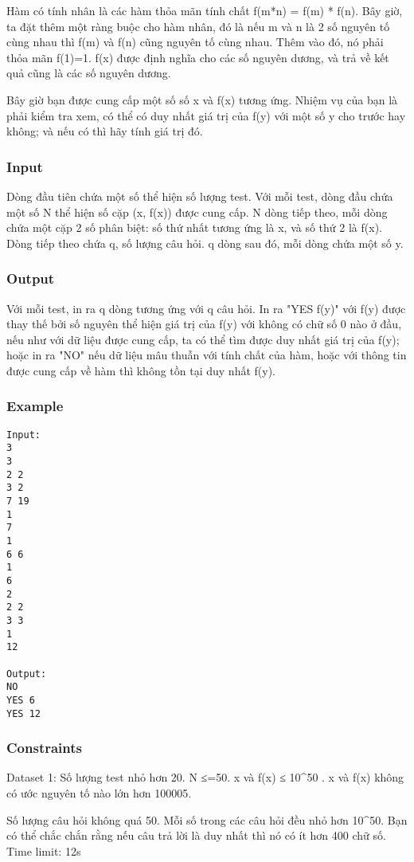 



   Hàm có tính nhân là các hàm thỏa mãn tính chất f(m*n) = f(m) * f(n). Bây giờ, ta đặt thêm một ràng buộc cho hàm nhân, đó là nếu m và n là 2 số nguyên tố cùng nhau thì f(m) và f(n) cũng nguyên tố cùng nhau. Thêm vào đó, nó phải thỏa mãn f(1)=1. f(x) được định nghĩa cho các số nguyên dương, và trả về kết quả cũng là các số nguyên dương.  

   Bây giờ bạn được cung cấp một số số x và f(x) tương ứng. Nhiệm vụ của bạn là phải kiểm tra xem, có thể có duy nhất giá trị của f(y) với một số y cho trước hay không; và nếu có thì hãy tính giá trị đó.  

\subsubsection{   Input  }

   Dòng đầu tiên chứa một số thể hiện số lượng test. Với mỗi test, dòng đầu chứa một số N thể hiện số cặp (x, f(x)) được cung cấp. N dòng tiếp theo, mỗi dòng chứa một cặp 2 số phân biệt: số thứ nhất tương ứng là x, và số thứ 2 là f(x). Dòng tiếp theo chứa q, số lượng câu hỏi. q dòng sau đó, mỗi dòng chứa một số y.  

\subsubsection{   Output  }

   Với mỗi test, in ra q dòng tương ứng với q câu hỏi. In ra "YES f(y)" với f(y) được thay thế bởi số nguyên thể hiện giá trị của f(y) với không có chữ số 0 nào ở đầu, nếu như với dữ liệu được cung cấp, ta có thể tìm được duy nhất giá trị của f(y); hoặc in ra "NO" nếu dữ liệu mâu thuẫn với tính chất của hàm, hoặc với thông tin được cung cấp về hàm thì không tồn tại duy nhất f(y).  

\subsubsection{   Example  }
\begin{verbatim}
Input:
3
3
2 2
3 2
7 19
1
7
1
6 6
1
6
2
2 2
3 3
1
12

Output:
NO
YES 6
YES 12
\end{verbatim}

\subsubsection{   Constraints  }

   Dataset 1: Số lượng test nhỏ hơn 20. N ≤=50. x và f(x) ≤ 10^50 . x và f(x) không có ước nguyên tố nào lớn hơn 100005.  

   Số lượng câu hỏi không quá 50. Mỗi số trong các câu hỏi đều nhỏ hơn 10^50. Bạn có thể chắc chắn rằng nếu câu trả lời là duy nhất thì nó có ít hơn 400 chữ số. Time limit: 12s  

